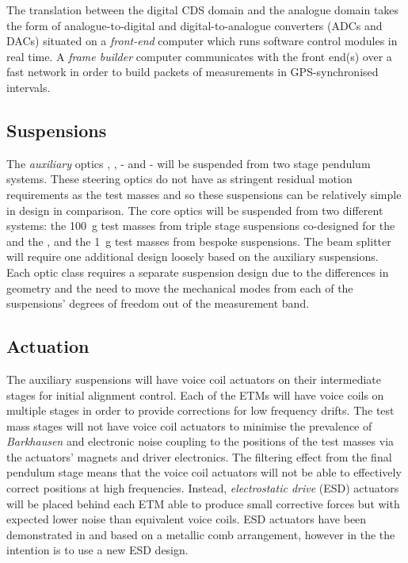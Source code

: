 The translation between the digital \gls{CDS} domain and the analogue domain takes the form of analogue-to-digital and digital-to-analogue converters (\glspl{ADC} and \glspl{DAC}) situated on a \emph{front-end} computer which runs software control modules in real time. A \emph{frame builder} computer communicates with the front end(s) over a fast network in order to build packets of measurements in \gls{GPS}-synchronised intervals.

\subsection{Suspensions}
The \emph{auxiliary} optics \MFOUR{}, \MFIVE{}, \MSEVEN{}-\MTEN{} and \MTWELVE{}-\MFIFTEEN{} will be suspended from two stage pendulum systems. These steering optics do not have as stringent residual motion requirements as the test masses and so these suspensions can be relatively simple in design in comparison. The core optics will be suspended from two different systems: the \SI{100}{\gram} test masses from triple stage suspensions co-designed for the \SSMEXPT{} and the \AEIPROTOTYPE{}, and the \SI{1}{\gram} test masses from bespoke  suspensions. The beam splitter \MSIX{} will require one additional design loosely based on the auxiliary suspensions. Each optic class requires a separate suspension design due to the differences in geometry and the need to move the mechanical modes from each of the suspensions' degrees of freedom out of the measurement band.

\subsection{Actuation}
The auxiliary suspensions will have voice coil actuators on their intermediate stages for initial alignment control. Each of the \glspl{ETM} will have voice coils on multiple stages in order to provide corrections for low frequency drifts. The test mass stages will not have voice coil actuators to minimise the prevalence of \emph{Barkhausen} \cite{Weiss2008} and electronic noise coupling to the positions of the test masses via the actuators' magnets and driver electronics. The filtering effect from the final pendulum stage means that the voice coil actuators will not be able to effectively correct positions at high frequencies. Instead, \emph{electrostatic drive} (\gls{ESD}) actuators will be placed behind each \gls{ETM} able to produce small corrective forces but with expected lower noise than equivalent voice coils. \gls{ESD} actuators have been demonstrated in \GEO{} \cite{Hewitson2007} and \ALIGO{} \cite{Aston2012} based on a metallic comb arrangement, however in the \SSMEXPT{} the intention is to use a new \gls{ESD} design.

